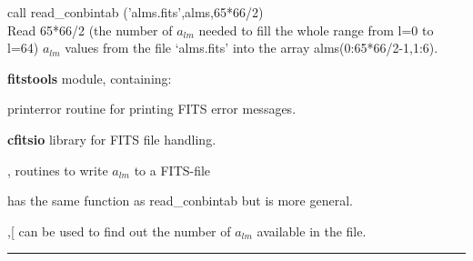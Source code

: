 \begin{example}
{
call read\_conbintab ('alms.fits',alms,65*66/2)  \\
}
{
Read 65*66/2 (the number of $a_{lm}$ needed to fill the whole range from l=0 to l=64)  $a_{lm}$  values from the file `alms.fits' into the array alms(0:65*66/2-1,1:6). 
}
\end{example}

\begin{modules}
  \begin{sulist}{} %
  \item[\textbf{fitstools}] module, containing:
  \item[printerror] routine for printing FITS error messages.
  \item[\textbf{cfitsio}] library for FITS file handling.		
  \end{sulist}
\end{modules}

\begin{related}
  \begin{sulist}{} %
  \item[\htmlref{alms2fits}{sub:alms2fits}, \htmlref{dump\_alms}{sub:dump_alms}] routines to write $a_{lm}$ to a FITS-file 
  \item[\htmlref{fits2alms}{sub:fits2alms}] has the same function as read\_conbintab but is more general.
  \item[\htmlref{number\_of\_alms}{sub:number_of_alms},[\htmlref{getsize\_fits}{sub:getsize_fits}]
  can be used to find out the number of $a_{lm}$ available in the file.
  \end{sulist}
\end{related}

\rule{\hsize}{2mm}

\newpage
